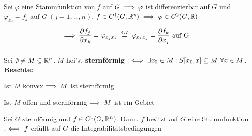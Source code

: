 \documentclass[a4paper,twoside,DIV15,BCOR12mm,chapterprefix=true,headings=twolinechapter]{scrbook}
\begin{document}
\begin{beweis}
Sei $\varphi$ eine Stammfunktion von $f$ auf $G\implies\varphi$ ist differenzierbar auf $G$ und $\varphi_{x_j}=f_j$ auf $G\ (j=1,\ldots,n)$. $f\in C^1(G,\mathbb{R}^n)\implies\varphi\in C^2(G,\mathbb{R})$
$$\folgt \frac{\partial f_j}{\partial x_k}=\varphi_{x_jx_k}\gleichnach{4.7}\varphi_{x_kx_j}=\frac{\partial f_k}{\partial x_j}\text{ auf G.}$$ $ $
\end{beweis}

\begin{definition*}
Sei $\emptyset\ne M\subseteq\mathbb{R}^n$. $M$ hei"st \textbf{sternförmig} $:\equizu\exists x_0\in M: S[x_0,x]\subseteq M\ \forall x\in M$.\\
\textbf{Beachte:}
\begin{liste}
\item Ist $M$ konvex$\implies M$ ist sternförmig
\item Ist $M$ offen und sternförmig$\implies M$ ist ein Gebiet
\end{liste}
\end{definition*}

\begin{satz}
Sei $G$ sternförmig und $f\in C^1(G,\mathbb{R}^n)$. Dann: $f$ besitzt auf $G$ eine Stammfunktion $:\iff f$ erfüllt auf $G$ die Integrabilitätsbedingungen
\end{satz}
\end{document}
